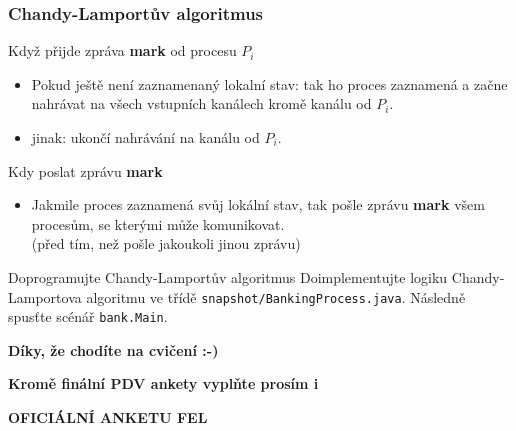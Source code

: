\documentclass[usenames,dvipsnames,9pt]{beamer}
\begin{document}
\begin{frame}
\frametitle{Chandy-Lamportův algoritmus}
Když přijde zpráva {\bf mark} od procesu $P_i$
\begin{itemize}
\item Pokud ještě není zaznamenaný lokalní stav: tak ho proces zaznamená a začne nahrávat na všech vstupních kanálech kromě kanálu od $P_i$.
\item jinak: ukončí nahrávání na kanálu od $P_i$.
\end{itemize}

Kdy poslat zprávu {\bf mark}
\begin{itemize}
\item Jakmile proces zaznamená svůj lokální stav, tak pošle zprávu {\bf mark} všem procesům, se kterými může komunikovat.\\ {\small (před tím, než pošle jakoukoli jinou zprávu)}
\end{itemize}
  \vspace{1em}
\begin{block}{Doprogramujte Chandy-Lamportův algoritmus}
    Doimplementujte logiku Chandy-Lamportova algoritmu ve třídě \texttt{snapshot/BankingProcess.java}. Následně spusťte scénář \texttt{bank.Main}.
  \end{block}
\end{frame}

\begin{frame}[standout]
    \begin{center}
      \textbf{\large Díky, že chodíte na cvičení :-)}
    \end{center}
    \vspace{3em}
    \begin{center}
      \textbf{\small Kromě finální PDV ankety vyplňte prosím i}

      \textbf{\LARGE OFICIÁLNÍ ANKETU FEL}
    \end{center}
    \vspace{3em}
\end{frame}



\end{document}
